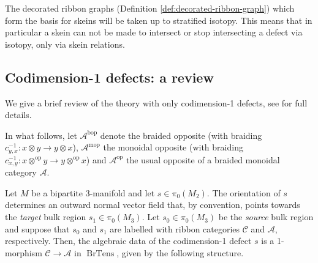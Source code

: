 \documentclass[a4paper]{article}
\numberwithin{equation}{section}
\newcommand{\1}{{\mathrm{1}\mkern-4mu{\mathchoice{}{}{\mskip-0.5mu}{\mskip-1mu}}\mathrm{l}}}
\newcommand{\A}{\mathcal{A}}
\newcommand{\C}{\mathcal{C}}
\newcommand{\op}{\text{op}}
\newcommand{\bop}{\text{bop}}
\newcommand{\mop}{\text{mop}}
\DeclareMathOperator{\BrTens}{BrTens}
\begin{document}
The decorated ribbon graphs (Definition \ref{def:decorated-ribbon-graph}) which form the basis for skeins will be taken up to stratified isotopy. This means that in particular a skein can not be made to intersect or stop intersecting a defect via isotopy, only via skein relations. 



\subsection{Codimension-1 defects: a review}\label{sec:surface_defects}
We give a brief review of the theory with only codimension-1 defects, see \cite{Brown_Jordan_2025} for full details. 

In what follows, let $\A^{\bop}$ denote the braided opposite (with braiding $c^{-1}_{y,x} : x\otimes y \to y\otimes x$), $\A^{\mop}$ the monoidal opposite (with braiding $c^{-1}_{x,y} : x\otimes^{\op} y \to y\otimes^{\op} x$) and $\A^{\op}$ the usual opposite of a braided monoidal category $\A$. 


Let $M$ be a bipartite $3$-manifold \cite[Def. 2.2]{Brown_Jordan_2025} and let $s\in\pi_0(M_2)$. The orientation of $s$ determines an outward normal vector field that, by convention, points towards the \emph{target} bulk region $s_1\in\pi_0(M_3)$. Let $s_0\in\pi_0(M_3)$ be the \emph{source} bulk region and suppose that $s_0$ and $s_1$ are labelled with ribbon categories $\C$ and $\A$, respectively. Then, the algebraic data of the codimension-1 defect $s$ is a 1-morphism $\C\to\A$ in $\BrTens$, given by the following structure. 
\end{document}
